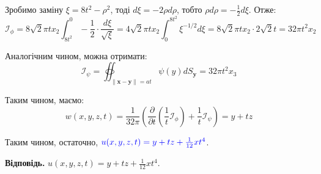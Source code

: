 \documentclass{hw_template}
\begin{document}
Зробимо заміну $\xi=8t^2-\rho^2$, тоді $d\xi = -2\rho d\rho$, тобто $\rho d\rho = -\frac{1}{2}d\xi$. Отже:
\begin{equation*}
    \mathcal{I}_{\phi} = 8\sqrt{2}\pi tx_2 \int_{8t^2}^{0} -\frac{1}{2}\cdot\frac{d\xi}{\sqrt{\xi}} = 4\sqrt{2}\pi tx_2 \int_0^{8t^2} \xi^{-1/2}d\xi = 8\sqrt{2}\pi tx_2 \cdot 2\sqrt{2}t = 32\pi t^2x_2
\end{equation*}

Аналогічним чином, можна отримати:
\begin{equation*}
    \mathcal{I}_{\psi} = \oiint_{\|\mathbf{x}-\mathbf{y}\|=at} \psi(y)dS_{\mathbf{y}} = 32\pi t^2x_3
\end{equation*}

Таким чином, маємо:
\begin{equation*}
    w(x,y,z,t) = \frac{1}{32\pi}\left(\frac{\partial}{\partial t}\left(\frac{1}{t}\mathcal{I}_{\phi}\right) + \frac{1}{t}\mathcal{I}_{\psi}\right) = y + tz
\end{equation*}

Таким чином, остаточно, $\textcolor{blue}{u(x,y,z,t) = y+tz+\frac{1}{12}xt^4}$.

\textbf{Відповідь.} $u(x,y,z,t) = y+tz+\frac{1}{12}xt^4$.
\end{document}
